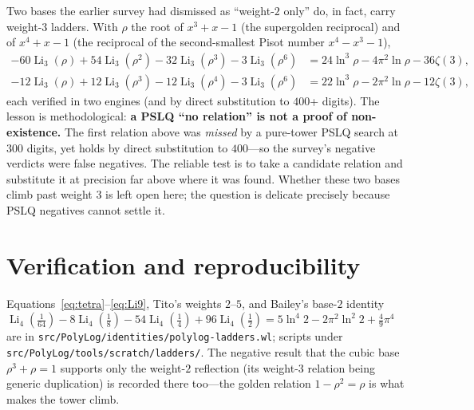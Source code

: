 \documentclass[11pt]{article}
\DeclareMathOperator{\Li}{Li}
\theoremstyle{plain}\newtheorem{theorem}{Theorem}\newtheorem{proposition}[theorem]{Proposition}
\theoremstyle{remark}\newtheorem{remark}[theorem]{Remark}
\begin{document}
Two bases the earlier survey had dismissed as ``weight-$2$ only'' do, in fact, carry weight-$3$ ladders. With
$\rho$ the root of $x^3+x-1$ (the supergolden reciprocal) and of $x^4+x-1$ (the reciprocal of the second-smallest
Pisot number $x^4-x^3-1$),
{\footnotesize
\begin{align*}
  -60\Li_3(\rho)+54\Li_3(\rho^2)-32\Li_3(\rho^3)-3\Li_3(\rho^6)&=24\ln^3\rho-4\pi^2\ln\rho-36\zeta(3),\\
  -12\Li_3(\rho)+12\Li_3(\rho^3)-12\Li_3(\rho^4)-3\Li_3(\rho^6)&=22\ln^3\rho-2\pi^2\ln\rho-12\zeta(3),
\end{align*}}
\!each verified in two engines (and by direct substitution to $400$+ digits). The lesson is methodological:
\textbf{a PSLQ ``no relation'' is not a proof of non-existence.} The first relation above was \emph{missed} by a
pure-tower PSLQ search at $300$ digits, yet holds by direct substitution to $400$---so the survey's negative
verdicts were false negatives. The reliable test is to take a candidate relation and substitute it at precision far
above where it was found. Whether these two bases climb past weight $3$ is left open here; the question is delicate
precisely because PSLQ negatives cannot settle it.

\section{Verification and reproducibility}
Equations~\eqref{eq:tetra}--\eqref{eq:Li9}, Tito's weights $2$--$5$, and Bailey's base-$2$ identity
$\Li_4(\tfrac1{64})-8\Li_4(\tfrac18)-54\Li_4(\tfrac14)+96\Li_4(\tfrac12)=5\ln^4 2-2\pi^2\ln^2 2+\tfrac49\pi^4$
are in \texttt{src/PolyLog/identities/polylog-ladders.wl}; scripts under
\texttt{src/PolyLog/tools/scratch/ladders/}. The negative result that the cubic base $\rho^3+\rho=1$ supports
only the weight-$2$ reflection (its weight-$3$ relation being generic duplication) is recorded there too---the
golden relation $1-\rho^2=\rho$ is what makes the tower climb.
\end{document}
